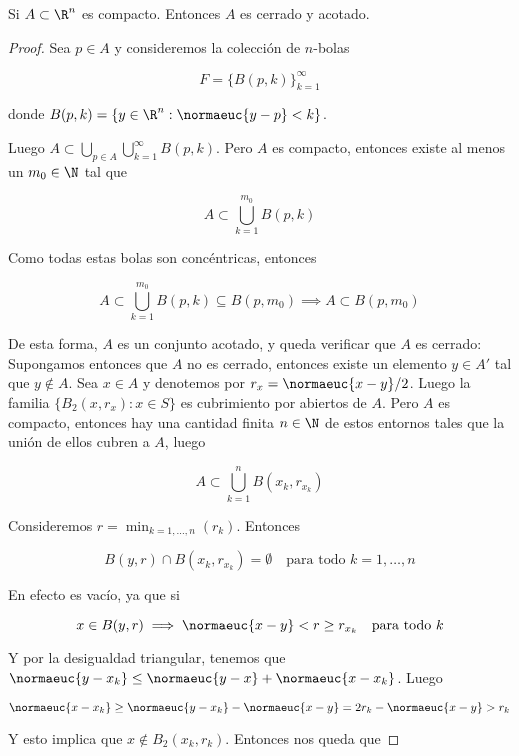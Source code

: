 \begin{teo}
    Si $A \subset \R^n$ es compacto. Entonces $A$ es cerrado y acotado.
\end{teo}

\begin{proof}
    Sea $p \in A$ y consideremos la colección de $n$-bolas
    
    \[
    F = \{ B(p, k) \}_{k=1}^{\infty}
    \]
    
    \noindent donde $B(p, k) = \{ y \in \R^n : \normaeuc{y-p} < k \}$.
    
    Luego $A \subset \bigcup_{p \in A} \bigcup_{k=1}^{\infty} B(p, k)$. Pero $A$ es compacto, entonces existe al menos un $m_0 \in \N$ tal que
    
    \[
    A \subset \bigcup_{k=1}^{m_0} B(p, k)
    \]
    
    Como todas estas bolas son concéntricas, entonces
    
    \[
    A \subset \bigcup_{k=1}^{m_0} B(p, k) \subseteq B(p, m_0) \implies A \subset B(p, m_0)
    \]
    
    De esta forma, $A$ es un conjunto acotado, y queda verificar que $A$ es cerrado: Supongamos entonces que $A$ no es cerrado, entonces existe un elemento $y \in A'$ tal que $y \notin A$. Sea $x \in A$ y denotemos por $r_x = \normaeuc{x - y} / 2$. Luego la familia $\{ B_2(x, r_x) : x \in S \}$ es cubrimiento por abiertos de $A$. Pero $A$ es compacto, entonces hay una cantidad finita $n \in \N$ de estos entornos tales que la unión de ellos cubren a $A$, luego
    
    \[
    A \subset \bigcup_{k=1}^n B(x_k, r_{x_k})
    \]
    
    Consideremos $r = \min_{k=1, \dots, n} (r_k)$. Entonces
    
    \[
    B(y, r) \cap B(x_k, r_{x_k}) = \emptyset \quad \text{para todo $k=1, \dots, n$}
    \]
    
    En efecto es vacío, ya que si
    
    \[
    x \in B(y, r) \implies \normaeuc{x-y} < r \geq r_{x_k} \quad \text{para todo $k$}
    \]
    
    Y por la desigualdad triangular, tenemos que $\normaeuc{y-x_k} \leq \normaeuc{y-x} + \normaeuc{x - x_k}$. Luego
    
    \[
    \normaeuc{x - x_k} \geq \normaeuc{y-x_k} - \normaeuc{x-y} = 2r_k - \normaeuc{x-y} > r_k
    \]
    
    Y esto implica que $x \notin B_2(x_k, r_k)$. Entonces nos queda que
    

\end{proof}

